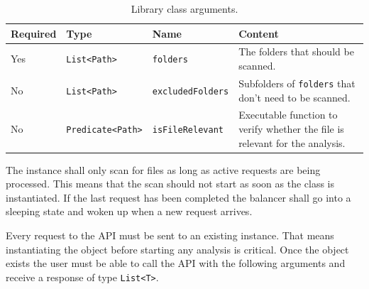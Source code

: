\documentclass[11pt]{article} %
\begin{document}
    \begin{table}[H]
        \centering
        \begin{tabular}{p{.1\linewidth} | p{.2\linewidth} | p{.2\linewidth} | p{.4\linewidth}}
            \textbf{Required} & \textbf{Type} & \textbf{Name} & \textbf{Content}
            \\\hline
            Yes & \verb|List<Path>| & \verb|folders| & The folders that should be scanned.
            \\\hline
            No & \verb|List<Path>| & \verb|excludedFolders| &
            Subfolders of
            \verb|folders|\hyperref[fn:1]{\footnotemark[1]} that don't need to be scanned. \\\hline
            No & \verb|Predicate<Path>| & \verb|isFileRelevant| & Executable function to verify whether the file is
            relevant\hyperref[fn:2]{\footnotemark[2]} for the analysis.
        \end{tabular}
        \caption{Library class arguments.}
        \label{tab:lib_args}
    \end{table}
    \label{fn:1}
    \label{fn:2}
    \addtocounter{footnote}{2}

    The instance shall only scan for files as long as active requests are being processed. This means that the scan
    should not start as soon as the class is instantiated. If the last request has been completed the balancer
    shall go into a sleeping state and woken up when a new request arrives.

    Every request to the API must be sent to an existing instance. That means instantiating the object before
    starting any analysis is critical. Once the object exists the user must be able to call the API with the following
    arguments and receive a response of type \verb|List<T>|.
\end{document}
